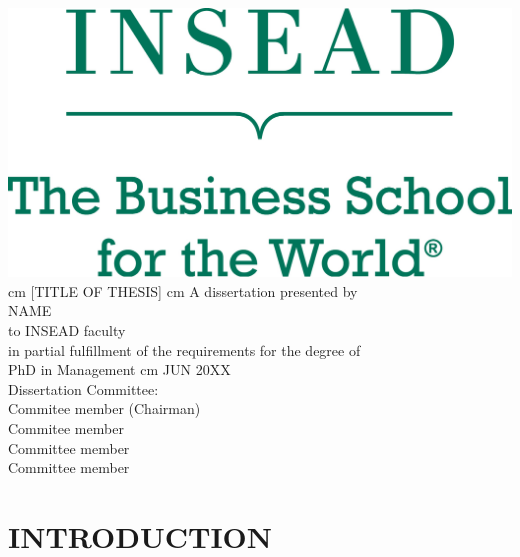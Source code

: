 \documentclass[a4paper, 11pt, twoside, openright,english]{thesis}
\numberwithin{equation}{section}
\numberwithin{figure}{section}
\numberwithin{table}{section}
\theoremstyle{plain}
\begin{document}
\begin{titlepage}
\centering
    \vfill
    \includegraphics[width=.4\linewidth]{greenstrapprint.jpg} 
       cm
    {\Large
        [TITLE OF THESIS]
         cm
        A dissertation presented by \\
        NAME\\
        to INSEAD faculty\\
        in partial fulfillment of the requirements for the degree of\\
        PhD in Management
	 cm
        JUN 20XX \\
        Dissertation Committee:\\
       Commitee member (Chairman)\\
       Commitee member\\
       Committee member\\
       Committee member        
       \vfill
    }    

\end{titlepage}








\tableofcontents	%
\listoffigures
\listoftables

\part{INTRODUCTION}
\label{part1}


\end{document}
